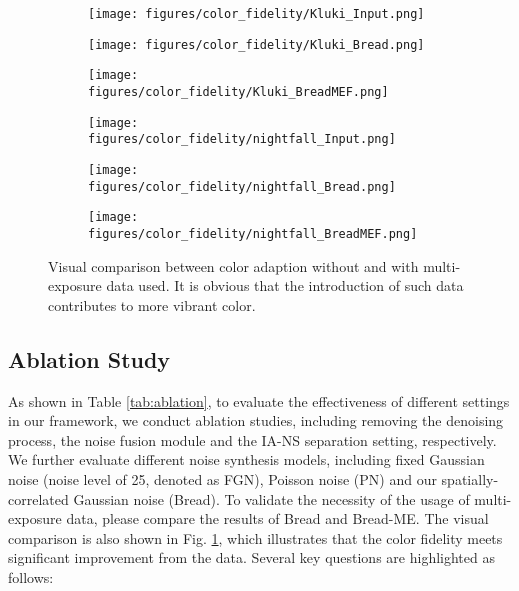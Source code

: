\documentclass[10pt,twocolumn,letterpaper]{article}
\begin{document}
\begin{figure}[t]
\begin{subfigure}{0.32\linewidth}
    \texttt{[image: figures/color\_fidelity/Kluki\_Input.png]}
\end{subfigure}
\hfill
\begin{subfigure}{0.32\linewidth}
    \texttt{[image: figures/color\_fidelity/Kluki\_Bread.png]}
\end{subfigure}
\hfill
\begin{subfigure}{0.32\linewidth}
    \texttt{[image: figures/color\_fidelity/Kluki\_BreadMEF.png]}
\end{subfigure}
\hfill

\vspace{3pt}

\begin{subfigure}{0.32\linewidth}
    \texttt{[image: figures/color\_fidelity/nightfall\_Input.png]}
\end{subfigure}
\hfill
\begin{subfigure}{0.32\linewidth}
    \texttt{[image: figures/color\_fidelity/nightfall\_Bread.png]}
\end{subfigure}
\hfill
\begin{subfigure}{0.32\linewidth}
    \texttt{[image: figures/color\_fidelity/nightfall\_BreadMEF.png]}
\end{subfigure}
\hfill

\vspace{-5pt}
\caption{Visual comparison between color adaption without and with multi-exposure data used. It is obvious that the introduction of such data contributes to more vibrant color.}\vspace{-5pt}
\label{fig:color_fidelity}
\end{figure}

\subsection{Ablation Study}
\label{sec:ablation}

As shown in Table \ref{tab:ablation}, to evaluate the effectiveness of different settings in our framework, we conduct ablation studies, including removing the denoising process, the noise fusion module and the IA-NS separation setting, respectively. We further evaluate different noise synthesis models, including fixed Gaussian noise (noise level of 25, denoted as FGN), Poisson noise (PN) and our spatially-correlated Gaussian noise (Bread). To validate the necessity of the usage of multi-exposure data, please compare the results of  Bread and Bread-ME. The visual comparison is also shown in Fig. \ref{fig:color_fidelity}, which illustrates that the color fidelity meets significant improvement from the data. Several key questions are highlighted as follows: 
\end{document}

